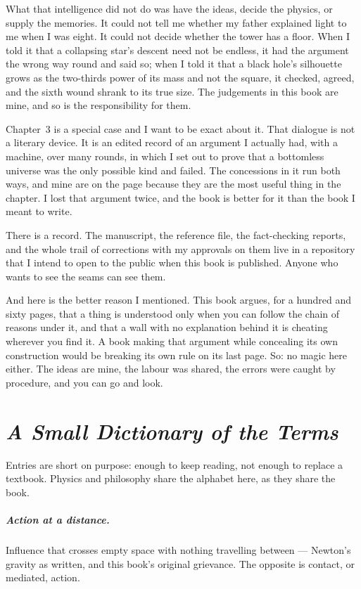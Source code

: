 \documentclass[fontsize=11pt,paper=a4,pagesize=auto,parskip=half-]{scrbook}
\begin{document}
What that intelligence did not do was have the ideas, decide the physics, or supply the memories. It could not tell me whether my father explained light to me when I was eight. It could not decide whether the tower has a floor. When I told it that a collapsing star's descent need not be endless, it had the argument the wrong way round and said so; when I told it that a black hole's silhouette grows as the two-thirds power of its mass and not the square, it checked, agreed, and the sixth wound shrank to its true size. The judgements in this book are mine, and so is the responsibility for them.

Chapter~3 is a special case and I want to be exact about it. That dialogue is not a literary device. It is an edited record of an argument I actually had, with a machine, over many rounds, in which I set out to prove that a bottomless universe was the only possible kind and failed. The concessions in it run both ways, and mine are on the page because they are the most useful thing in the chapter. I lost that argument twice, and the book is better for it than the book I meant to write.

There is a record. The manuscript, the reference file, the fact-checking reports, and the whole trail of corrections with my approvals on them live in a repository that I intend to open to the public when this book is published. Anyone who wants to see the seams can see them.

And here is the better reason I mentioned. This book argues, for a hundred and sixty pages, that a thing is understood only when you can follow the chain of reasons under it, and that a wall with no explanation behind it is cheating wherever you find it. A book making that argument while concealing its own construction would be breaking its own rule on its last page. So: no magic here either. The ideas are mine, the labour was shared, the errors were caught by procedure, and you can go and look.

\appendix

\chapter{\emph{A Small Dictionary of the Terms}}

Entries are short on purpose: enough to keep reading, not enough to replace a textbook. Physics and philosophy share the alphabet here, as they share the book.

\paragraph{Action at a distance.} Influence that crosses empty space with nothing travelling between --- Newton's gravity as written, and this book's original grievance. The opposite is contact, or mediated, action.
\end{document}
